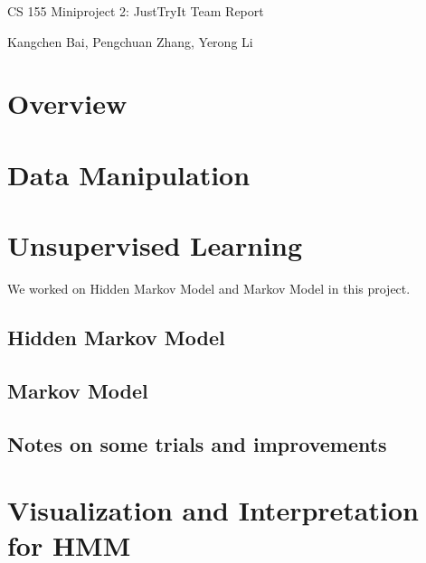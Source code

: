 
\usepackage[]{mcode}





\pagestyle{fancy}

\LARGE
\begin{center}
CS 155 Miniproject 2: JustTryIt Team Report

\large
Kangchen Bai, Pengchuan Zhang, Yerong Li
\end{center}

\normalsize
\medskip

\section{Overview}



\section{Data Manipulation}


\section{Unsupervised Learning}
We worked on Hidden Markov Model and Markov Model in this project.

\subsection{Hidden Markov Model}

\subsection{Markov Model}

\subsection{Notes on some trials and improvements}


\section{Visualization and Interpretation for HMM}


